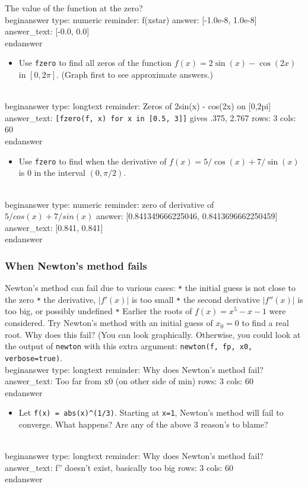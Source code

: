 \documentclass[12pt]{article}
\begin{document}
\newline
The value of the function at the zero?
\\begin{answer}
    type: numeric
    reminder: f(xstar)
    answer: [-1.0e-8, 1.0e-8]
    answer_text: [-0.0, 0.0] 
\\end{answer}
\begin{itemize}\item Use \texttt{fzero} to find all zeros of the function $f(x) = 2\sin(x) -   \cos(2x)$ in $[0, 2\pi]$. (Graph first to see approximate answers.)\end{itemize}
\\begin{answer}
type: longtext
reminder: Zeros of 2sin(x) - cos(2x) on [0,2pi]
answer_text: \verb+[fzero(f, x) for x in [0.5, 3]]+ gives .375, 2.767 
rows: 3
cols: 60
\\end{answer}
\begin{itemize}\item Use \texttt{fzero} to find when the derivative of $f(x) = 5/\cos(x) +   7/\sin(x)$ is $0$ in the interval $(0, \pi/2)$.\end{itemize}
\\begin{answer}
    type: numeric
    reminder: zero of derivative of \( 5/cos(x) + 7/sin(x) \)
    answer: [0.841349666225046, 0.8413696662250459]
    answer_text: [0.841, 0.841] 
\\end{answer}
\subsubsection{When Newton's method fails}\newline
Newton's method can fail due to various cases:\newline
\texttt{*} the initial guess is not close to the zero\newline
\texttt{*} the derivative, $|f'(x)|$ is too small\newline
\texttt{*} the second derivative $|f''(x)|$ is too big, or possibly undefined\newline
\texttt{*} Earlier  the roots of $f(x) = x^5 - x - 1$ were considered. Try   Newton's method with an initial guess of $x_0=0$ to find a real   root. Why does this fail? (You can look graphically. Otherwise, you   could look at the output of \texttt{newton} with this extra argument:   \texttt{newton(f, fp, x0, verbose=true)}.
\\begin{answer}
type: longtext
reminder: Why does Newton's method fail?
answer_text: Too far from x0 (on other side of min) 
rows: 3
cols: 60
\\end{answer}
\begin{itemize}\item Let \texttt{f(x) = abs(x)^(1/3)}. Starting at \texttt{x=1}, Newton's method will   fail to converge. What happens? Are any of the above 3 reason's to   blame?\end{itemize}
\\begin{answer}
type: longtext
reminder: Why does Newton's method fail?
answer_text: f'' doesn't exist, basically too big 
rows: 3
cols: 60
\\end{answer}
\end{document}
